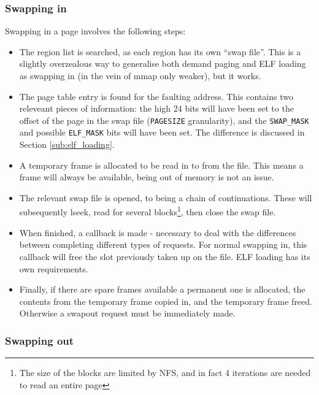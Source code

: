 \documentclass[12pt,english]{article}
\begin{document}
\subsubsection{Swapping in}

Swapping in a page involves the following steps:
\begin{itemize}
\item The region list is searched, as each region has its own ``swap file''.  This is a slightly overzealous way to generalise both demand paging and ELF loading as swapping in (in the vein of mmap only weaker), but it works.
\item The page table entry is found for the faulting address.  This contains two releveant pieces of information: the high 24 bits will have been set to the offset of the page in the swap file (\texttt{PAGESIZE} granularity), and the \texttt{SWAP\_MASK} and possible \texttt{ELF\_MASK} bits will have been set.  The difference is discussed in Section \ref{sub:elf_loading}.
\item A temporary frame is allocated to be read in to from the file.  This means a frame will always be available, being out of memory is not an issue.
\item The relevant swap file is opened, to being a chain of continuations.  These will subsequently lseek, read for several blocks\footnote{The size of the blocks are limited by NFS, and in fact 4 iterations are needed to read an entire page}, then close the swap file.
\item When finished, a callback is made - necessary to deal with the differences between completing different types of requests.  For normal swapping in, this callback will free the slot previously taken up on the file.  ELF loading has its own requirements.
\item Finally, if there are spare frames available a permanent one is allocated, the contents from the temporary frame copied in, and the temporary frame freed.  Otherwise a swapout request must be immediately made.
\end{itemize}
\subsubsection{Swapping out}
\end{document}
